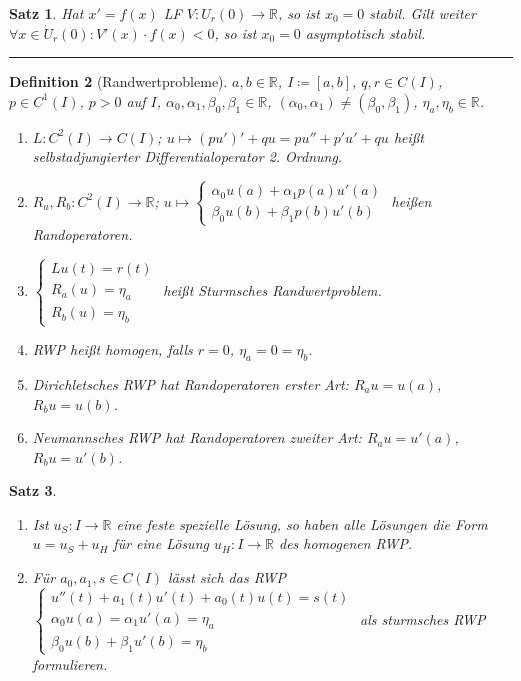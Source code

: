 \documentclass[a4paper]{article}
\newcounter{Sec}
\theoremstyle{marginbreak}
\newtheorem{definition}{Definition}[Sec]
\newtheorem{satz}[definition]{Satz}
\newcommand{\sep}{%
	\rule{\textwidth}{0.3pt}%
	\stepcounter{Sec}%
	}
\newcommand{\R}{\mathbb{R}}
\begin{document}
	\begin{satz}
		Hat $x'=f(x)$ LF $V\colon U_r(0)\to\R$, so ist $x_0=0$ stabil. Gilt weiter
		$\forall x\in\dot{U}_r(0): V'(x)\cdot f(x)<0$, so ist $x_0=0$ asymptotisch stabil.
	\end{satz}
	\sep
	\begin{definition}[Randwertprobleme]
		$a, b\in\R$, $I\coloneqq [a, b]$, $q, r\in C(I)$, $p\in C^1(I)$, $p>0$ auf $I$,
		$\alpha_0,\alpha_1,\beta_0,\beta_1\in\R$, $(\alpha_0,\alpha_1)\neq(\beta_0,\beta_1)$, $\eta_a,\eta_b\in\R$.
		\begin{enumerate}[label=(\alph*)]
			\item $L\colon C^2(I)\to C(I)$; $u\mapsto (pu')'+qu = pu''+p'u'+qu$ heißt selbstadjungierter
				Differentialoperator 2. Ordnung.
			\item $R_a, R_b\colon C^2(I)\to\R$; $u\mapsto\begin{cases}\alpha_0 u(a)+\alpha_1p(a)u'(a)\\
				\beta_0u(b)+\beta_1p(b)u'(b)\end{cases}$ heißen Randoperatoren.
			\item $\begin{cases}Lu(t)=r(t)\\R_a(u)=\eta_a\\R_b(u)=\eta_b\end{cases}$ heißt
				Sturmsches Randwertproblem.
			\item RWP heißt homogen, falls $r=0$, $\eta_a=0=\eta_b$.
			\item Dirichletsches RWP hat Randoperatoren erster Art: $R_au=u(a)$, $R_bu=u(b)$.
			\item Neumannsches RWP hat Randoperatoren zweiter Art: $R_au=u'(a)$, $R_bu=u'(b)$.
		\end{enumerate}
	\end{definition}
	\begin{satz}
		\begin{enumerate}[label=(\alph*)]
			\item Ist $u_S\colon I\to\R$ eine feste spezielle Lösung, so haben alle Lösungen
				die Form $u=u_S+u_H$ für eine Lösung $u_H\colon I\to\R$ des homogenen RWP.
			\item Für $a_0, a_1, s\in C(I)$ lässt sich das RWP $\begin{cases}u''(t)+a_1(t)u'(t)+a_0(t)u(t)=s(t)\\
				\alpha_0u(a)=\alpha_1u'(a)=\eta_a\\\beta_0u(b)+\beta_1u'(b)=\eta_b\end{cases}$ als sturmsches
				RWP formulieren.
		\end{enumerate}
	\end{satz}
\end{document}
